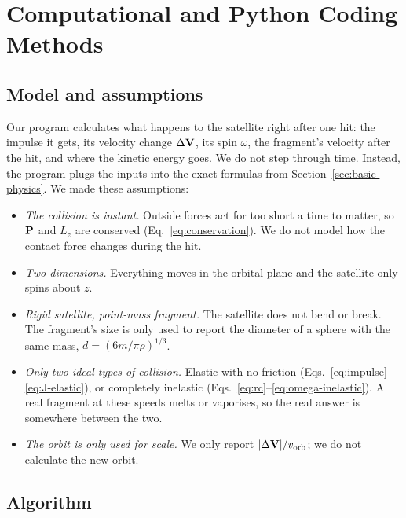 \newpage
\section{Computational and Python Coding Methods}
\label{sec:computational-methods}

\subsection{Model and assumptions}

Our program calculates what happens to the satellite right after one hit:
the impulse it gets, its velocity change $\Delta\mathbf{V}$, its spin
$\omega$, the fragment's velocity after the hit, and where the kinetic
energy goes. We do not step through time. Instead, the program plugs the
inputs into the exact formulas from Section~\ref{sec:basic-physics}. We
made these assumptions:
\begin{itemize}
  \item \textit{The collision is instant.} Outside forces act for too
    short a time to matter, so $\mathbf{P}$ and $L_z$ are conserved
    (Eq.~\eqref{eq:conservation}). We do not model how the contact force
    changes during the hit.
  \item \textit{Two dimensions.} Everything moves in the orbital plane and
    the satellite only spins about $z$.
  \item \textit{Rigid satellite, point-mass fragment.} The satellite does
    not bend or break. The fragment's size is only used to report the
    diameter of a sphere with the same mass, $d=(6m/\pi\rho)^{1/3}$.
  \item \textit{Only two ideal types of collision.} Elastic with no
    friction (Eqs.~\eqref{eq:impulse}--\eqref{eq:J-elastic}), or completely
    inelastic (Eqs.~\eqref{eq:rc}--\eqref{eq:omega-inelastic}). A real
    fragment at these speeds melts or vaporises, so the real answer is
    somewhere between the two.
  \item \textit{The orbit is only used for scale.} We only report
    $|\Delta\mathbf{V}|/v_{\mathrm{orb}}$; we do not calculate the new orbit.
\end{itemize}

\subsection{Algorithm}

